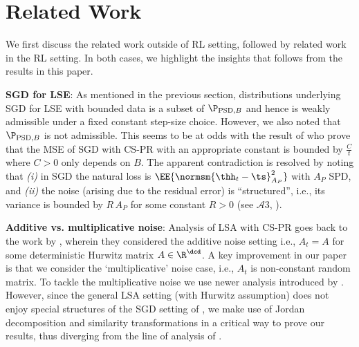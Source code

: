 \section{Related Work}\label{sec:related}
We first discuss the related work outside of RL setting, followed by related work in the RL setting. In both cases, we highlight the  insights that follows from the results in this paper.

\textbf{SGD for LSE}: As mentioned in the previous section, distributions underlying
SGD for LSE with bounded data 
is a subset of $\P_{\text{PSD},B}$ and hence is weakly admissible under a fixed constant step-size choice. 
However, we also noted that $\P_{\text{PSD},B}$ is not admissible. This seems to be at odds with the result of \citet{bach}
who prove that the MSE of SGD with CS-PR with an appropriate constant is bounded by
$\frac{C}{t}$ where $C>0$ only depends on $B$. The apparent contradiction is resolved by noting that 
{\em (i)} in SGD the natural loss is $\EE{\normsm{\thh_t-\ts}^2_{A_P}}$ with $A_P$ SPD, and 
{\em (ii)} the noise (arising due to the residual error) is ``structured'', i.e., its variance 
is bounded by $R\,A_P$ for some constant $R>0$ (see $\mathcal{A}3$, \cite{bach}).

\textbf{Additive vs. multiplicative noise}: Analysis of LSA with CS-PR goes back to the work by \citet{polyak-judisky}, wherein they considered the additive noise setting i.e., $A_t=A$ for some deterministic Hurwitz matrix $A\in \R^{\dcd}$.
A key improvement in our paper is that we consider the `multiplicative' noise case, i.e., $A_t$ is non-constant random matrix. To tackle the multiplicative noise we use newer analysis introduced by \citet{bach}. However, since the general LSA setting (with Hurwitz assumption) does not enjoy special structures of the SGD setting of \citet{bach}, we make use of Jordan decomposition and similarity transformations in a critical way to prove our results, thus diverging from the line of analysis of 
\citet{bach}.

